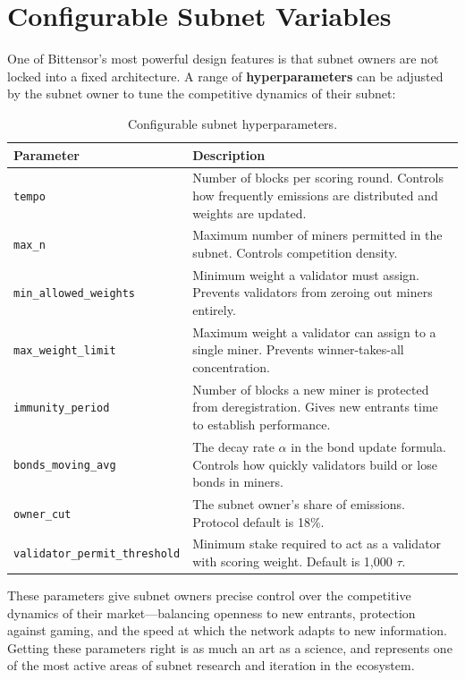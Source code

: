 \documentclass[12pt, a4paper, oneside]{report}
\newcommand{\TAO}{$\tau$}            %
\theoremstyle{definition}
\begin{document}
\section{Configurable Subnet Variables}

One of Bittensor's most powerful design features is that subnet owners are 
not locked into a fixed architecture. A range of \textbf{hyperparameters} 
can be adjusted by the subnet owner to tune the competitive dynamics of their 
subnet:

\begin{table}[H]
\centering
\renewcommand{\arraystretch}{1.8}
\begin{tabular}{p{4.5cm} p{8.5cm}}
\toprule
\textbf{Parameter} & \textbf{Description} \\
\midrule
\texttt{tempo} & Number of blocks per scoring round. Controls how frequently 
emissions are distributed and weights are updated. \\
\texttt{max\_n} & Maximum number of miners permitted in the subnet. Controls 
competition density. \\
\texttt{min\_allowed\_weights} & Minimum weight a validator must assign. 
Prevents validators from zeroing out miners entirely. \\
\texttt{max\_weight\_limit} & Maximum weight a validator can assign to a 
single miner. Prevents winner-takes-all concentration. \\
\texttt{immunity\_period} & Number of blocks a new miner is protected from 
deregistration. Gives new entrants time to establish performance. \\
\texttt{bonds\_moving\_avg} & The decay rate $\alpha$ in the bond update 
formula. Controls how quickly validators build or lose bonds in miners. \\
\texttt{owner\_cut} & The subnet owner's share of emissions. Protocol default 
is 18\%. \\
\texttt{validator\_permit\_threshold} & Minimum stake required to act as a 
validator with scoring weight. Default is 1,000 \TAO. \\
\bottomrule
\end{tabular}
\caption{Configurable subnet hyperparameters.}
\label{tab:hyperparams}
\end{table}

\noindent These parameters give subnet owners precise control over the 
competitive dynamics of their market—balancing openness to new entrants, 
protection against gaming, and the speed at which the network adapts to 
new information. Getting these parameters right is as much an art as a 
science, and represents one of the most active areas of subnet research 
and iteration in the ecosystem.
\end{document}
